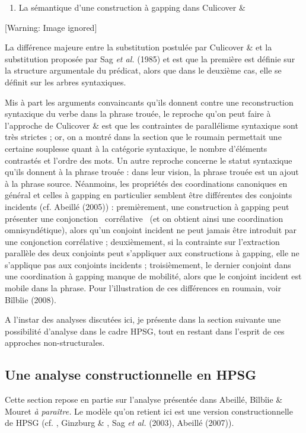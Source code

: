 \begin{enumerate}
\item   \label{bkm:Ref300951078}La sémantique d'une construction à gapping dans Culicover \& \citet{Jackendoff2005}


\end{enumerate}
  [Warning: Image ignored] %
 

La différence majeure entre la substitution postulée par Culicover \& \citet{Jackendoff2005} et la substitution proposée par Sag \textit{et al.} (1985) et \citet{Gardent1991} est que la première est définie sur la structure argumentale du prédicat, alors que dans le deuxième cas, elle se définit sur les arbres syntaxiques. 

Mis à part les arguments convaincants qu'ils donnent contre une reconstruction syntaxique du verbe dans la phrase trouée, le reproche qu'on peut faire à l'approche de Culicover \& \citet{Jackendoff2005} est que les contraintes de parallélisme syntaxique sont très strictes ; or, on a montré dans la section  que le roumain permettait une certaine souplesse quant à la catégorie syntaxique, le nombre d'éléments contrastés et l'ordre des mots. Un autre reproche concerne le statut syntaxique qu'ils donnent à la phrase trouée : dans leur vision, la phrase trouée est un ajout à la phrase source. Néanmoins, les propriétés des coordinations canoniques en général et celles à gapping en particulier semblent être différentes des conjoints incidents (cf. Abeillé (2005)) : premièrement, une construction à gapping peut présenter une conjonction {\guillemotleft}~corrélative~{\guillemotright} (et on obtient ainsi une coordination omnisyndétique), alors qu'un conjoint incident ne peut jamais être introduit par une conjonction corrélative ; deuxièmement, si la contrainte sur l'extraction parallèle des deux conjoints peut s'appliquer aux constructions à gapping, elle ne s'applique pas aux conjoints incidents ; troisièmement, le dernier conjoint dans une coordination à gapping manque de mobilité, alors que le conjoint incident est mobile dans la phrase. Pour l'illustration de ces différences en roumain, voir Bîlbîie (2008). 

A l'instar des analyses discutées ici, je présente dans la section suivante une possibilité d'analyse dans le cadre HPSG, tout en restant dans l'esprit de ces approches non-structurales.

\subsection{Une analyse constructionnelle en HPSG}
\label{bkm:Ref290285733}Cette section repose en partie sur l'analyse présentée dans Abeillé, Bîlbîie \& Mouret \textit{à paraître.} Le modèle qu'on retient ici est une version constructionnelle de HPSG (cf. \citet{Sag1997}, Ginzburg \& \citet{Sag2000}, Sag \textit{et al.} (2003), Abeillé (2007)). 

